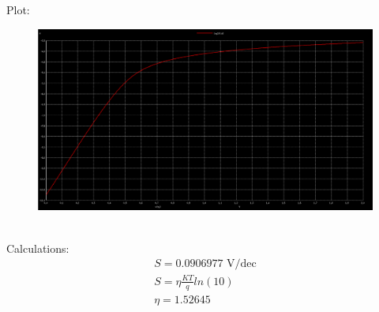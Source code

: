 \documentclass{article}
\begin{document}
Plot:\\
\begin{figure}[!ht]
    \centering
    \includegraphics[scale=0.25]{Images/4dnmoss.png}
\end{figure}\\
Calculations:
\begin{align}
    S = 0.0906977 \text{ V/dec} \\
    S = \eta \frac{KT}{q} ln(10) \\
    \eta = 1.52645
\end{align}
\\
\end{document}
